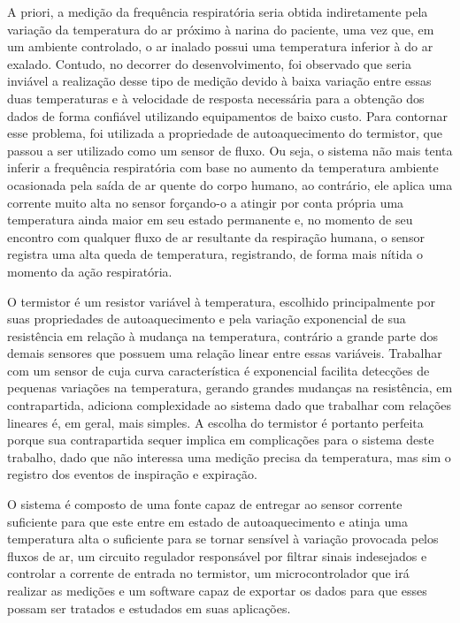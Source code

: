 	A priori, a medição da frequência respiratória seria obtida indiretamente pela variação da temperatura do ar próximo à narina do paciente, uma vez que, em um ambiente controlado, o ar inalado possui uma temperatura inferior à do ar exalado. Contudo, no decorrer do desenvolvimento, foi observado que seria inviável a realização desse tipo de medição devido à baixa variação entre essas duas temperaturas e à velocidade de resposta necessária para a obtenção dos dados de forma confiável utilizando equipamentos de baixo custo. Para contornar esse problema, foi utilizada a propriedade de autoaquecimento do termistor, que passou a ser utilizado como um sensor de fluxo. Ou seja, o sistema não mais tenta inferir a frequência respiratória com base no aumento da temperatura ambiente ocasionada pela saída de ar quente do corpo humano, ao contrário, ele aplica uma corrente muito alta no sensor forçando-o a atingir por conta própria uma temperatura ainda maior em seu estado permanente e, no momento de seu encontro com qualquer fluxo de ar resultante da respiração humana, o sensor registra uma alta queda de temperatura, registrando, de forma mais nítida o momento da ação respiratória.

	O termistor é um resistor variável à temperatura, escolhido principalmente por suas propriedades de autoaquecimento e pela variação exponencial de sua resistência em relação à mudança na temperatura, contrário a grande parte dos demais sensores que possuem uma relação linear entre essas variáveis. Trabalhar com um sensor de cuja curva característica é exponencial facilita detecções de pequenas variações na temperatura, gerando grandes mudanças na resistência, em contrapartida, adiciona complexidade ao sistema dado que trabalhar com relações lineares é, em geral, mais simples. A escolha do termistor é portanto perfeita porque sua contrapartida sequer implica em complicações para o sistema deste trabalho, dado que não interessa uma medição precisa da temperatura, mas sim o registro dos eventos de inspiração e expiração.
	
	O sistema é composto de uma fonte capaz de entregar ao sensor corrente suficiente para que este entre em estado de autoaquecimento e atinja uma temperatura alta o suficiente para se tornar sensível à variação provocada pelos fluxos de ar, um circuito regulador responsável por filtrar sinais indesejados e controlar a corrente de entrada no termistor, um microcontrolador que irá realizar as medições e um software capaz de exportar os dados para que esses possam ser tratados e estudados em suas aplicações.  

